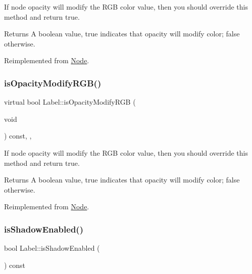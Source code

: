 If node opacity will modify the R\+GB color value, then you should override this method and return true. \begin{DoxyReturn}{Returns}
A boolean value, true indicates that opacity will modify color; false otherwise. 
\end{DoxyReturn}


Reimplemented from \hyperlink{classNode_ae6ce32d2088e2bb3426608334f1091c5}{Node}.

\mbox{\label{classLabel_ade8bf273e99add4d4861697d469f6d89}} 
\subsubsection{\texorpdfstring{is\+Opacity\+Modify\+R\+G\+B()}{isOpacityModifyRGB()}\hspace{0.1cm}{\footnotesize\ttfamily [2/2]}}
{\footnotesize\ttfamily virtual bool Label\+::is\+Opacity\+Modify\+R\+GB (\begin{DoxyParamCaption}\item[{void}]{ }\end{DoxyParamCaption}) const\hspace{0.3cm}{\ttfamily [inline]}, {\ttfamily [override]}, {\ttfamily [virtual]}}

If node opacity will modify the R\+GB color value, then you should override this method and return true. \begin{DoxyReturn}{Returns}
A boolean value, true indicates that opacity will modify color; false otherwise. 
\end{DoxyReturn}


Reimplemented from \hyperlink{classNode_ae6ce32d2088e2bb3426608334f1091c5}{Node}.

\mbox{\label{classLabel_ada5f28d2fbfcb18862890be2b36fd1d8}} 
\subsubsection{\texorpdfstring{is\+Shadow\+Enabled()}{isShadowEnabled()}\hspace{0.1cm}{\footnotesize\ttfamily [1/2]}}
{\footnotesize\ttfamily bool Label\+::is\+Shadow\+Enabled (\begin{DoxyParamCaption}{ }\end{DoxyParamCaption}) const\hspace{0.3cm}{\ttfamily [inline]}}

